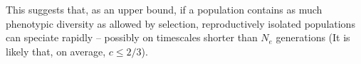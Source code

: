 \documentclass{article}
\newcommand{\1}{\mathbbm{1}}
\begin{document}
  This suggests that, as an upper bound, if a population contains as much phenotypic diversity as allowed by selection, reproductively isolated populations can speciate rapidly -- possibly on timescales shorter than $N_{e}$ generations (It is likely that, on average, $c \leq 2/3$).
\end{document}
